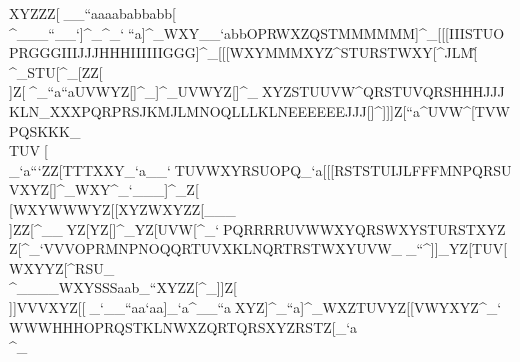 XYZZZ[                                                            ^^^__``aaaababbabb[\\^___``__`]^_^_`                                                            ^^^``a]^_WXY__`abbOPRWXZQSTMMMMMM]^_                                                            [[[IIISTUOPRGGGIIIJJJHHHIIIIIIGGG]^_                                                            [[[WXYMMMXYZ\]^STURSTWXY[\]\]^JLM[\^                                                            \\\UVW[\]UVWOPROPRUVWWXYTUVTUVXYZ``a                                                            ___^^_[\]WXYVWXYZ[]^_STU[\][\]OOO_`a                                                            \\\YZ[^_`[\]OQRRSUWXYPQRUVX[\]_``_`a                                                            ___]^_[\]ZZ[\\]Z[\XXXYZ[WXYWXYWXYZZ[                                                            ^^^]^^^^_``a``aUVWYZ[]^_]^_UVWYZ[]^_                                                            ^^^XYZSTUUVW\]^QRSTUVQRSHHHJJJKLN\]_                                                            XXXPQRPRSJKMJLMNOQLLLKLNEEEEEEJJJ[]^                                                            ]]]Z[\WXZ``a\]^UVW\]^[\]TVWPQSKKK\]_                                                            \\\YZ[OOORSUGGGPQRTUV\\]TUV^^_[\\_`a                                                            ```ZZ[TTTXXY_`a__`^^_TUVWXYRSUOPQ_`a                                                            [[[RSTSTUIJLFFFMNPQRSUVXYZ[]^_WXY^_`                                                            ___]^_Z[\[\][\]WXYWWWYZ[[\]XYZWXYZZ[                                                            ___\\]ZZ[^__^^_YZ[YZ[]^_YZ[UVW[\]^_`                                                            ^^^PQRRRRUVWWXYQRSWXYSTURSTXYZZ[\^_`                                                            VVVOPRMNPNOQQRTUVXKLNQRTRSTWXYUVW\]_                                                            ^^^_``\]^]]_YZ[TUV[\]WXYYZ[\]^RSU\]_                                                            \\\WXYSTUQRTPQSSTUTUVZ[\TUV[\]VWX]^_                                                            ___WXYSSSaab_``XYZZ[\UVXZ[\STUOPR^_`                                                            [[[Z[\UVXUVXVWYWXY\]^``a[\]XYZVWX_`a                                                            ___]^_\]]\]]Z[\\]]VVVXYZ[[\YZ[XYZZZ[                                                            ___^^__``]^^__`__``aa`aa\]]_`a^__``a                                                            ^^^XYZ]^_``a]^_WXZTUVYZ[[\]VWYXYZ^_`                                                            WWWHHHOPRQSTKLNWXZQRTQRSXYZRSTZ[\_`a                                                            \\\WXYNOQWXYWXYUVWXYZ[\]``aZ[\KLN\]_                                                            \\\YZ[WXYTUVZ[\STUXYZWXYVWXVVVWXY]^_                            